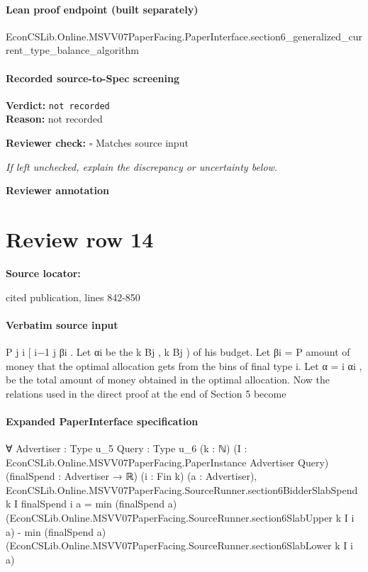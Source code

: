 \documentclass[10pt]{article}
\newcommand{\reviewerbox}{%
  \par\noindent\fbox{\parbox{0.96\linewidth}{\rule{0pt}{0.38in}}}\par
}
\newcommand{\reviewmatch}[1]{%
  \par\noindent\textbf{Reviewer check:} $\square$\; #1\par
  \noindent\emph{If left unchecked, explain the discrepancy or uncertainty below.}\par
}
\begin{document}
\paragraph{Lean proof endpoint (built separately)}\begin{ReviewVerbatim}
EconCSLib.Online.MSVV07PaperFacing.PaperInterface.section6_generalized_current_type_balance_algorithm
\end{ReviewVerbatim}

\paragraph{Recorded source-to-Spec screening}
\textbf{Verdict:} \texttt{not recorded}
\\
\textbf{Reason:} not recorded
\reviewmatch{Matches source input}
\noindent\textbf{Reviewer annotation}\par
\reviewerbox
\clearpage
\hypertarget{source-claim-f639bf63e3f8af10}{}
\section*{Review row 14}
\textbf{Source locator:} {\footnotesize\raggedright cited publication, lines 842-\allowbreak{}850\par}
\paragraph{Verbatim source input}
\begin{ReviewVerbatim}
P j
i
[ i−1
j βi . Let αi be the
k Bj , k Bj ) of his budget. Let βi =
P amount of money that the optimal
allocation gets from the bins of final type i. Let α = i αi , be the total amount of money
obtained in the optimal allocation.
Now the relations used in the direct proof at the end of Section 5 become
\end{ReviewVerbatim}


\paragraph{Expanded PaperInterface specification}
\begin{ReviewVerbatim}
∀ {Advertiser : Type u_5} {Query : Type u_6} (k : ℕ)
  (I : EconCSLib.Online.MSVV07PaperFacing.PaperInstance Advertiser Query) (finalSpend : Advertiser → ℝ) (i : Fin k)
  (a : Advertiser),
  EconCSLib.Online.MSVV07PaperFacing.SourceRunner.section6BidderSlabSpend k I finalSpend i a =
    min (finalSpend a) (EconCSLib.Online.MSVV07PaperFacing.SourceRunner.section6SlabUpper k I i a) -
      min (finalSpend a) (EconCSLib.Online.MSVV07PaperFacing.SourceRunner.section6SlabLower k I i a)
\end{ReviewVerbatim}
\end{document}
